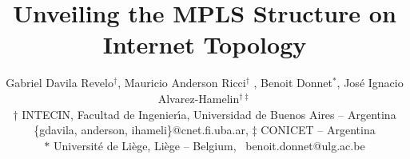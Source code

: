 \documentclass[conference]{IEEEtran} %
\begin{document}
\title{	Unveiling the MPLS Structure on Internet Topology}
\author{Gabriel Davila Revelo{$^{\dag}$}, Mauricio Anderson Ricci{$^{\dag}$} , Benoit Donnet{$^{\ast}$},
Jos\'e Ignacio Alvarez-Hamelin{$^{\dag\ddag}$}\\
$\dag$ INTECIN, Facultad de Ingenier\'{\i}a, Universidad de Buenos Aires -- Argentina\\ 
\{gdavila, anderson, ihameli\}@cnet.fi.uba.ar, $\ddag$ CONICET -- Argentina \\
$\ast$ Universit\'e de Li\`ege, Li\`ege -- Belgium,~ 
benoit.donnet@ulg.ac.be\\
}

\maketitle











{\small
 
 
}
\end{document}
